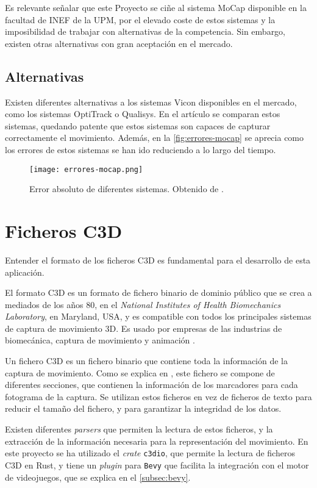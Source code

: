 Es relevante señalar que este Proyecto se ciñe al sistema \ac{MoCap} disponible en la facultad de INEF de la \ac{UPM}, por el elevado coste de estos sistemas y la imposibilidad de trabajar con alternativas de la competencia. Sin embargo, existen otras alternativas con gran aceptación en el mercado.

\subsection{Alternativas}
Existen diferentes alternativas a los sistemas Vicon disponibles en el mercado, como los sistemas OptiTrack o Qualisys. En el artículo \autocite{article} se comparan estos sistemas, quedando patente que estos sistemas son capaces de capturar correctamente el movimiento. Además, en la \autoref{fig:errores-mocap} se aprecia como los errores de estos sistemas se han ido reduciendo a lo largo del tiempo.

\begin{figure}[H]
    \centering
    \texttt{[image: errores-mocap.png]}
    \caption{Error absoluto de diferentes sistemas. Obtenido de \autocite{article}.}
    \label{fig:errores-mocap}
\end{figure}

\section{Ficheros \acs{C3D}} \label{sec:ficheros-c3d}
Entender el formato de los ficheros \ac{C3D} es fundamental para el desarrollo de esta aplicación. 

El formato \ac{C3D} es un formato de fichero binario de dominio público que se crea a mediados de los años 80, en el \textit{National Institutes of Health Biomechanics Laboratory}, en Maryland, USA, y es compatible con todos los principales sistemas de captura de movimiento 3D. Es usado por empresas de las industrias de biomecánica, captura de movimiento y animación \autocite{C3DORGBiomechanicsStandard}.

Un fichero \ac{C3D} es un fichero binario que contiene toda la información de la captura de movimiento. Como se explica en \autocite{C3DORGBiomechanicsStandard}, este fichero se compone de diferentes secciones, que contienen la información de los marcadores para cada fotograma de la captura. Se utilizan estos ficheros en vez de ficheros de texto para reducir el tamaño del fichero, y para garantizar la integridad de los datos.

Existen diferentes \textit{parsers} que permiten la lectura de estos ficheros, y la extracción de la información necesaria para la representación del movimiento. En este proyecto se ha utilizado el \textit{crate} \texttt{c3dio}, que permite la lectura de ficheros \ac{C3D} en Rust, y tiene un \textit{plugin} para \texttt{Bevy} que facilita la integración con el motor de videojuegos, que se explica en el \autoref{subsec:bevy}.


